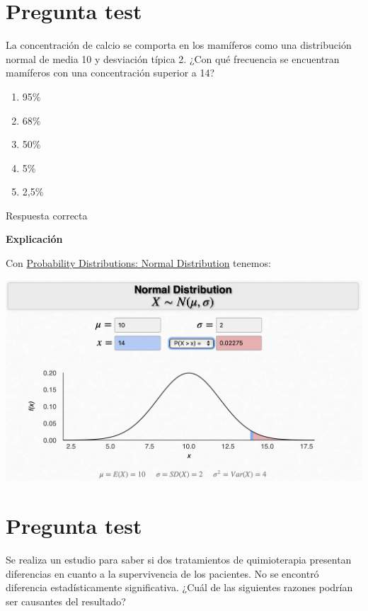 \documentclass[
]{book}
\providecommand{\tightlist}{%
  \setlength{\itemsep}{0pt}\setlength{\parskip}{0pt}}
\begin{document}
\hypertarget{pregunta-test-110}{%
\section{Pregunta test}\label{pregunta-test-110}}

La concentración de calcio se comporta en los mamíferos como una distribución normal de media 10 y desviación típica 2. ¿Con qué frecuencia se encuentran mamíferos con una concentración superior a 14?

\begin{enumerate}
\def\labelenumi{\alph{enumi})}
\tightlist
\item
  95\%
\item
  68\%
\item
  50\%
\item
  5\%
\item
  2,5\%
\end{enumerate}

Respuesta correcta

\textbf{Explicación}

Con \href{https://homepage.divms.uiowa.edu/~mbognar/applets/normal.html}{Probability Distributions: Normal Distribution} tenemos:

\includegraphics[width=20.78in]{img/3_3}

\hypertarget{pregunta-test-111}{%
\section{Pregunta test}\label{pregunta-test-111}}

Se realiza un estudio para saber si dos tratamientos de quimioterapia presentan diferencias en cuanto a la supervivencia de los pacientes. No se encontró diferencia estadísticamente significativa. ¿Cuál de las siguientes razones podrían ser causantes del resultado?
\end{document}
